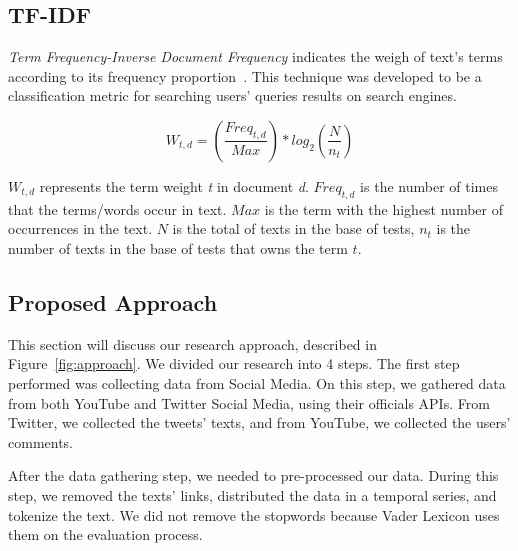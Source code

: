 \subsection{TF-IDF\label{TFID}}

\textit{Term Frequency-Inverse Document Frequency} indicates the weigh of text's terms according to its frequency proportion~\cite{Dipanjan:2016}. This technique was developed to be a classification metric for searching users' queries results on search engines.

\begin{equation*}
    W_{t,d} = \left ( \frac{Freq_{t,d}}{Max} \right ) * log_2 \left ( \frac{N}{n_t} \right)
\end{equation*}

\( W_{t,d}\) represents the term weight \textit{t} in document \textit{d}. \( Freq_{t,d}\) is the number of times that the terms/words occur in text. \( Max\) is the term with the highest number of occurrences in the text. 
\( N \) is the total of texts in the base of tests, \( n_t \) is the number of texts in the base of tests that owns the term \( t \).


\subsection{Proposed Approach}

This section will discuss our research approach, described in Figure~\ref{fig:approach}. 
We divided our research into 4 steps. The first step performed was collecting data from Social Media. On this step, we gathered data from both YouTube and Twitter Social Media, using their officials APIs. From Twitter, we collected the tweets' texts, and from YouTube, we collected the users' comments.

After the data gathering step, we needed to pre-processed our data. During this step, we removed the texts' links, distributed the data in a temporal series, and tokenize the text. We did not remove the stopwords because Vader Lexicon uses them on the evaluation process.


